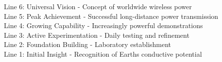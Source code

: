 \documentclass[
]{article}
\begin{document}
Line 6: Universal Vision - Concept of worldwide wireless power\\
Line 5: Peak Achievement - Successful long-distance power transmission\\
Line 4: Growing Capability - Increasingly powerful demonstrations\\
Line 3: Active Experimentation - Daily testing and refinement\\
Line 2: Foundation Building - Laboratory establishment\\
Line 1: Initial Insight - Recognition of Earth\textquotesingle s
conductive potential
\end{document}

